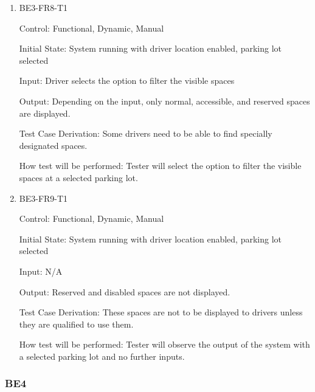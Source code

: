\documentclass[12pt, titlepage]{article}
\begin{document}
\begin{enumerate}

\item{BE3-FR8-T1}

Control: Functional, Dynamic, Manual
					
Initial State: System running with driver location enabled, parking lot selected
					
Input: Driver selects the option to filter the visible spaces
					
Output: Depending on the input, only normal, accessible, and reserved spaces are
displayed.

Test Case Derivation: Some drivers need to be able to find specially designated
spaces.
					
How test will be performed: Tester will select the option to filter the visible
spaces at a selected parking lot.

\item{BE3-FR9-T1}

Control: Functional, Dynamic, Manual
					
Initial State: System running with driver location enabled, parking lot selected
					
Input: N/A
					
Output: Reserved and disabled spaces are not displayed.

Test Case Derivation: These spaces are not to be displayed to drivers unless
they are qualified to use them.
					
How test will be performed: Tester will observe the output of the system with a
selected parking lot and no further inputs.

\end{enumerate}

\subsubsection{BE4}
\end{document}

